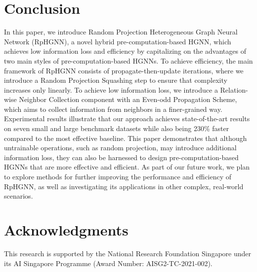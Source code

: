 \documentclass[lettersize,journal]{IEEEtran}
\begin{document}
\section{Conclusion}



In this paper, we introduce Random Projection Heterogeneous Graph Neural Network (RpHGNN), a novel hybrid pre-computation-based HGNN, which achieves low information loss and efficiency by capitalizing on the advantages of two main styles of pre-computation-based HGNNs.
To achieve efficiency, the main framework of RpHGNN consists of propagate-then-update iterations, where we introduce a Random Projection Squashing step to ensure that complexity increases only linearly.
To achieve low information loss, we introduce a Relation-wise Neighbor Collection component with an Even-odd Propagation Scheme, which aims to collect information from neighbors in a finer-grained way. 
Experimental results illustrate that our approach achieves state-of-the-art results on seven small and large benchmark datasets while also being 230\% faster compared to the most effective baseline.  
This paper demonstrates that although untrainable operations, such as random projection, may introduce additional information loss, they can also be harnessed to design pre-computation-based HGNNs that are more effective and efficient.
As part of our future work, we plan to explore methods for further improving the performance and efficiency of RpHGNN, as well as investigating its applications in other complex, real-world scenarios.





























\section*{Acknowledgments}

This research is supported by the National Research Foundation Singapore under its AI Singapore Programme (Award Number: AISG2-TC-2021-002).
\end{document}

